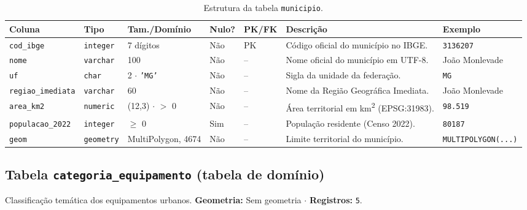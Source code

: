 \documentclass[
    12pt,
    oneside,
    a4paper,
    chapter=TITLE,
    section=TITLE,
    brazil
]{abntex2}
\begin{document}
\begin{table}[H]
\centering
\caption{Estrutura da tabela \texttt{municipio}.}
\label{tab:municipio}
\scriptsize
\begin{tabularx}{\textwidth}{p{2.3cm} p{1.6cm} p{2.2cm} p{0.9cm} p{0.9cm} X p{2.1cm}}
\toprule
\textbf{Coluna} & \textbf{Tipo} & \textbf{Tam./Domínio} & \textbf{Nulo?} & \textbf{PK/FK} & \textbf{Descrição} & \textbf{Exemplo} \\
\midrule
\texttt{cod\_ibge} & \texttt{integer} & 7 dígitos & Não & PK & Código oficial do município no IBGE. & \texttt{3136207} \\
\texttt{nome} & \texttt{varchar} & 100 & Não & -- & Nome oficial do município em UTF-8. & João Monlevade \\
\texttt{uf} & \texttt{char} & 2 $\cdot$ \texttt{'MG'} & Não & -- & Sigla da unidade da federação. & \texttt{MG} \\
\texttt{regiao\_imediata} & \texttt{varchar} & 60 & Não & -- & Nome da Região Geográfica Imediata. & João Monlevade \\
\texttt{area\_km2} & \texttt{numeric} & (12,3) $\cdot$ $>$ 0 & Não & -- & Área territorial em km\textsuperscript{2} (EPSG:31983). & \texttt{98.519} \\
\texttt{populacao\_2022} & \texttt{integer} & $\ge$ 0 & Sim & -- & População residente (Censo 2022). & \texttt{80187} \\
\texttt{geom} & \texttt{geometry} & MultiPolygon, 4674 & Não & -- & Limite territorial do município. & \texttt{MULTIPOLYGON(...)} \\
\bottomrule
\end{tabularx}
\end{table}

\subsection{Tabela \texttt{categoria\_equipamento} (tabela de domínio)}
Classificação temática dos equipamentos urbanos. \textbf{Geometria:} Sem geometria $\cdot$ \textbf{Registros:} \texttt{5}.
\end{document}
